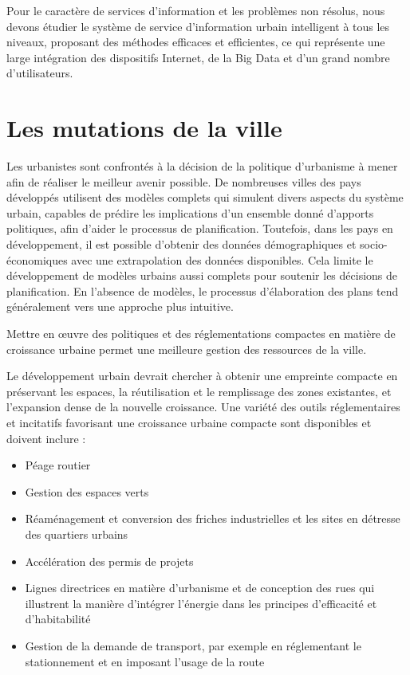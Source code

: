 Pour le caractère de services d'information et les problèmes non résolus,
nous devons étudier le système de service d'information urbain intelligent à tous les niveaux,
proposant des méthodes efficaces et efficientes, ce qui représente une large intégration des
dispositifs Internet, de la Big Data et d'un grand nombre d'utilisateurs.

\section{Les mutations de la ville}

Les urbanistes sont confrontés à la décision de la politique d'urbanisme à mener afin de réaliser le meilleur avenir possible.
De nombreuses villes des pays développés utilisent des modèles complets qui simulent divers aspects du système urbain,
capables de prédire les implications d'un ensemble donné d'apports politiques, afin d'aider le processus de planification.
Toutefois, dans les pays en développement, il est possible d'obtenir des données démographiques et socio-économiques
avec une extrapolation des données disponibles.
Cela limite le développement de modèles urbains aussi complets pour soutenir les décisions de planification.
En l'absence de modèles, le processus d'élaboration des plans tend généralement vers une approche plus intuitive.

Mettre en œuvre des politiques et des réglementations compactes en matière de croissance urbaine
permet une meilleure gestion des ressources de la ville.

Le développement urbain devrait chercher à obtenir une empreinte compacte en préservant les
espaces, la réutilisation et le remplissage des zones existantes, et l'expansion dense de la nouvelle croissance.
Une variété des outils réglementaires et incitatifs favorisant une croissance urbaine compacte sont disponibles
et doivent inclure :

\begin{itemize}
    \item Péage routier
    \item Gestion des espaces verts
    \item Réaménagement et conversion des friches industrielles et les sites en détresse des quartiers urbains
    \item Accélération des permis de projets
    \item Lignes directrices en matière d'urbanisme et de conception des rues qui illustrent la manière d'intégrer l'énergie
    dans les principes d'efficacité et d'habitabilité
    \item Gestion de la demande de transport, par exemple en réglementant le stationnement et en imposant l'usage de la route
\end{itemize}

